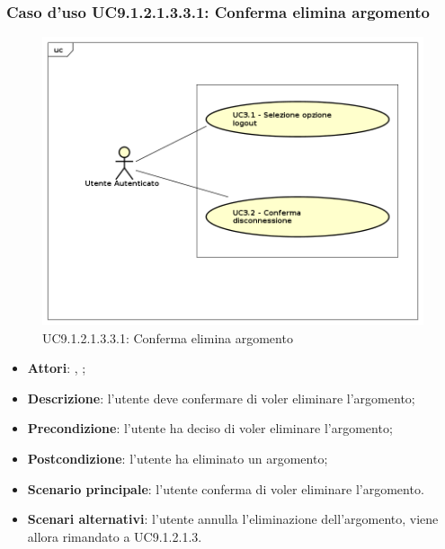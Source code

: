 							\subsubsection{Caso d'uso UC9.1.2.1.3.3.1: Conferma elimina argomento}
							\label{UC9.1.2.1.3.3.1}
							\begin{figure}[h]
								\centering
								\includegraphics[scale=0.5,keepaspectratio]{UML/UC9.png}
								\caption{UC9.1.2.1.3.3.1: Conferma elimina argomento}
							\end{figure}
							\FloatBarrier
							\begin{itemize}
								\item \textbf{Attori}: \uau, \uaupro;
								\item \textbf{Descrizione}: l'utente deve confermare di voler eliminare l'argomento;
								\item \textbf{Precondizione}: l'utente ha deciso di voler eliminare l'argomento;
								\item \textbf{Postcondizione}: l'utente ha eliminato un argomento;
								\item \textbf{Scenario principale}: l'utente conferma di voler eliminare l'argomento. 
								\item \textbf{Scenari alternativi}: l'utente annulla l'eliminazione dell'argomento, viene allora rimandato a UC9.1.2.1.3.
							\end{itemize}						
						
